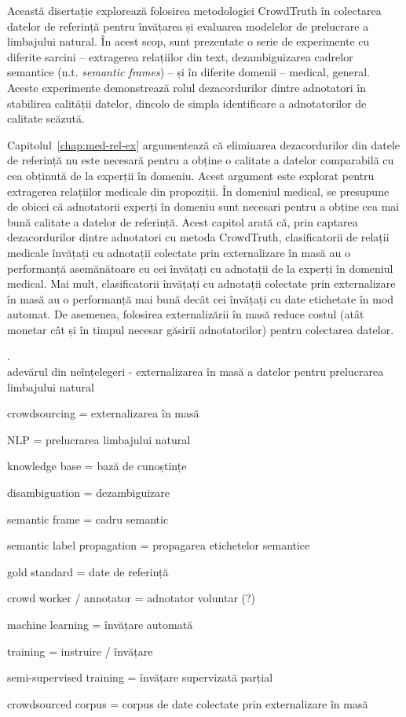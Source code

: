 Această disertație explorează folosirea metodologiei CrowdTruth în colectarea datelor de referință pentru învățarea și evaluarea modelelor de prelucrare a limbajului natural. În acest scop, sunt prezentate o serie de experimente cu diferite sarcini -- extragerea relațiilor din text, dezambiguizarea cadrelor semantice (n.t. \textit{semantic frames}) -- și în diferite domenii -- medical, general. Aceste experimente demonstrează rolul dezacordurilor dintre adnotatori în stabilirea calității datelor, dincolo de simpla identificare a adnotatorilor de calitate scăzută.

Capitolul~\ref{chap:med-rel-ex} argumentează că eliminarea dezacordurilor din datele de referință nu este necesară pentru a obține o calitate a datelor comparabilă cu cea obținută de la experții în domeniu. Acest argument este explorat pentru extragerea relațiilor medicale din propoziții. În domeniul medical, se presupune de obicei că adnotatorii experți în domeniu sunt necesari pentru a obține cea mai bună calitate a datelor de referință. Acest capitol arată că, prin captarea dezacordurilor dintre adnotatori cu metoda CrowdTruth, clasificatorii de relații medicale învățați cu adnotații colectate prin externalizare în masă au o performanță asemănătoare cu cei învățați cu adnotații de la experți în domeniul medical. Mai mult, clasificatorii învățați cu adnotații colectate prin externalizare în masă au o performanță mai bună decât cei învățați cu date etichetate în mod automat. De asemenea, folosirea externalizării în masă reduce costul (atât monetar cât și în timpul necesar găsirii adnotatorilor) pentru colectarea datelor.

. \\

adevărul din neînțelegeri  - externalizarea în masă a datelor pentru prelucrarea limbajului natural

crowdsourcing = externalizarea în masă %

NLP = prelucrarea limbajului natural

knowledge base = bază de cunoștințe

disambiguation = dezambiguizare

semantic frame = cadru semantic %

semantic label propagation = propagarea etichetelor semantice

gold standard = date de referință

crowd worker / annotator = adnotator voluntar (?)

machine learning = învățare automată

training = instruire / învățare

semi-supervised training = învățare supervizată parțial

crowdsourced corpus = corpus de date colectate prin externalizare în masă

